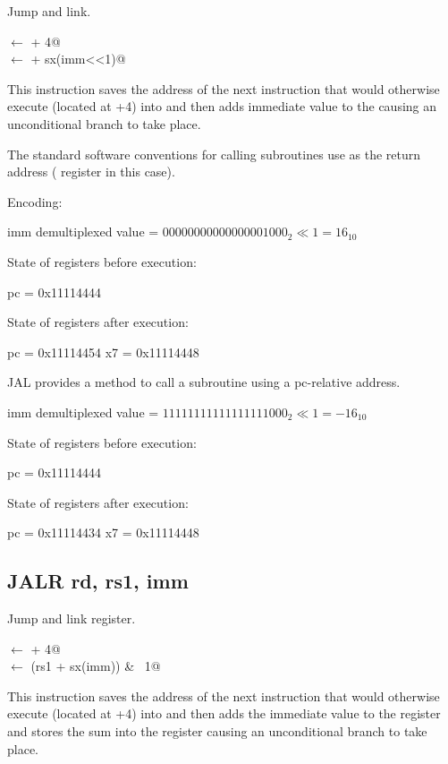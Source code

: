 Jump and link.

\verb@rd@ $\leftarrow$ \verb@pc + 4@\\
\verb@pc@ $\leftarrow$ \verb@pc + sx(imm<<1)@

This instruction saves the address of the next instruction
that would otherwise execute (located at +4) into 
 and then adds immediate value to the  causing
an unconditional branch to take place.

The standard software conventions for calling subroutines
use  as the return address ( register in this 
case).~\cite[p.~16]{rvismv1v22:2017}


Encoding:


imm demultiplexed value = $00000000000000001000_2 \ll 1 = 16_{10}$


State of registers before execution:

pc = 0x11114444

State of registers after execution:

pc = 0x11114454
x7 = 0x11114448

JAL provides a method to call a subroutine using a pc-relative address.



imm demultiplexed value = $11111111111111111000_2 \ll 1 = -16_{10}$

State of registers before execution:

pc = 0x11114444

State of registers after execution:

pc = 0x11114434
x7 = 0x11114448


\subsection{JALR rd, rs1, imm}

Jump and link register.

\verb@rd@ $\leftarrow$ \verb@pc + 4@\\
\verb@pc@ $\leftarrow$ \verb@(rs1 + sx(imm)) & ~1@

This instruction saves the address of the next instruction
that would otherwise execute (located at +4) into 
 and then adds the immediate value to the  
register and stores the sum into the  register causing
an unconditional branch to take place.

